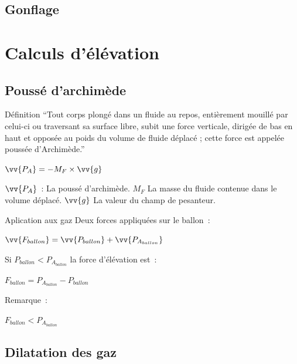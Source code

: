 \documentclass{beamer}
\begin{document}
\subsection{Gonflage}

\section{Calculs d'élévation}

\subsection{Poussé d'archimède}

\begin{frame}{Définition}
  \enquote{Tout corps plongé dans un fluide au repos, entièrement mouillé par celui-ci ou traversant sa surface libre, subit une force verticale, dirigée de bas en haut et opposée au poids du volume de fluide déplacé ; cette force est appelée poussée d'Archimède.}
  \bigbreak
  \begin{center}
    $\vv{P_A} = -M_F \times \vv{g}$
  \end{center}
  $\vv{P_A}$~: La poussé d'archimède. $M_F$ La masse du fluide contenue dans le volume déplacé. $\vv{g}$ La valeur du champ de pesanteur.
\end{frame}

\begin{frame}{Aplication aux gaz}
  Deux forces appliquées sur le ballon~: \\
  \begin{center}
    $\displaystyle{\vv{F_{ballon}} = \vv{P_{ballon}} + \vv{P_{A_{ballon}}}}$ \\
  \end{center}
  Si $P_{ballon} < P_{A_{ballon}}$ la force d'élévation est~:
  \begin{center}
    $\displaystyle{F_{ballon} = P_{A_{ballon}} - P_{ballon}}$ \\
  \end{center}
  Remarque~:\\
  \begin{center}
    $F_{ballon} < P_{A_{ballon}}$
  \end{center}
\end{frame}

\subsection{Dilatation des gaz}
\end{document}
